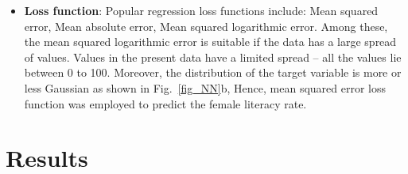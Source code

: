 \documentclass{article}
\begin{document}
\begin{itemize}
	\item \textbf{Loss function}: Popular regression loss functions include: Mean squared error, Mean absolute error,  Mean squared logarithmic  error. Among these, the mean squared logarithmic  error  is suitable if the data has a large spread of values. Values in the present data have a limited spread -- all the values lie between 0 to 100. Moreover, the distribution of the target variable is more or less Gaussian as shown in Fig.~\ref{fig_NN}b, Hence, mean squared error loss function was employed to predict the female literacy rate.   	

\end{itemize}

\section{Results}
\end{document}
